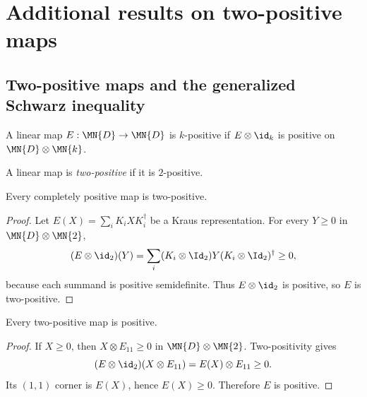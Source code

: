 \section{Additional results on two-positive maps}

\subsection{Two-positive maps and the generalized Schwarz inequality}

\begin{definition}\label{def:k_positive_map}
    \leanok
    A linear map $E : \MN{D} \to \MN{D}$ is $k$-positive if
    $E \otimes \id_{k}$ is positive on $\MN{D} \otimes \MN{k}$.
\end{definition}

\begin{definition}
    \leanok
    A linear map is \emph{two-positive} if it is $2$-positive.
\end{definition}

\begin{theorem}
    \label{thm:cp_implies_two_positive}
    \leanok
    Every completely positive map is two-positive.
\end{theorem}

\begin{proof}
    \leanok
    Let $E(X)=\sum_i K_iXK_i^\dagger$ be a Kraus representation. For every
    $Y\geq0$ in $\MN{D}\otimes\MN{2}$,
    \[
        (E\otimes\id_2)(Y)
        =\sum_i (K_i\otimes\Id_2)Y(K_i\otimes\Id_2)^\dagger\geq0,
    \]
    because each summand is positive semidefinite. Thus
    $E\otimes\id_2$ is positive, so $E$ is two-positive.
\end{proof}

\begin{theorem}
    \label{thm:two_positive_implies_positive}
    \leanok
    Every two-positive map is positive.
\end{theorem}

\begin{proof}
    \leanok
    If $X\geq0$, then $X\otimes E_{11}\geq0$ in
    $\MN{D}\otimes\MN{2}$. Two-positivity gives
    \[
        (E\otimes\id_2)(X\otimes E_{11})=E(X)\otimes E_{11}\geq0.
    \]
    Its $(1,1)$ corner is $E(X)$, hence $E(X)\geq0$. Therefore $E$ is
    positive.
\end{proof}

